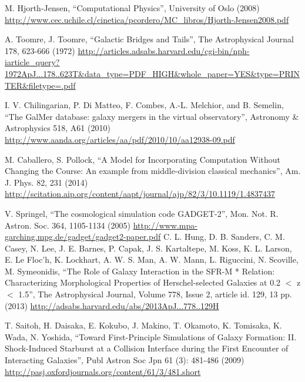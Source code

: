 \documentclass[11pt]{article}
\begin{document}
\begin{thebibliography}{99}

 M. Hjorth-Jensen, ``Computational Physics'', University of Oslo (2008) \url{http://www.cec.uchile.cl/cinetica/pcordero/MC_libros/Hjorth-Jensen2008.pdf}

 A. Toomre, J. Toomre, ``Galactic Bridges and Tails'', The Astrophysical Journal 178, 623-666 (1972) \url{http://articles.adsabs.harvard.edu/cgi-bin/nph-iarticle_query?1972ApJ...178..623T&data_type=PDF_HIGH&whole_paper=YES&type=PRINTER&filetype=.pdf}

I. V. Chilingarian, P. Di Matteo, F. Combes, A.-L. Melchior, and B. Semelin, ``The GalMer database: galaxy mergers in the virtual observatory'', Astronomy \& Astrophysics 518, A61 (2010) \url{http://www.aanda.org/articles/aa/pdf/2010/10/aa12938-09.pdf}

 M. Caballero, S. Pollock, ``A Model for Incorporating Computation Without Changing the Course: An example from middle-division classical mechanics'', Am. J. Phys. 82, 231 (2014) \url{http://scitation.aip.org/content/aapt/journal/ajp/82/3/10.1119/1.4837437}

 V. Springel, ``The cosmological simulation code GADGET-2'', Mon. Not. R. Astron. Soc. 364, 1105-1134 (2005) \url{http://www.mpa-garching.mpg.de/gadget/gadget2-paper.pdf}	 
 C. L. Hung, D. B. Sanders, C. M. Casey, N. Lee, J. E. Barnes, P. Capak, J. S. Kartaltepe, M. Koss, K. L. Larson, E. Le Floc'h, K. Lockhart, A. W. S. Man, A. W. Mann, L. Riguccini, N. Scoville, M. Symeonidis, ``The Role of Galaxy Interaction in the SFR-M * Relation: Characterizing Morphological Properties of Herschel-selected Galaxies at 0.2 $<$ z $<$ 1.5'', The Astrophysical Journal, Volume 778, Issue 2, article id. 129, 13 pp. (2013) \url{http://adsabs.harvard.edu/abs/2013ApJ...778..129H}

 T. Saitoh, H. Daisaka, E. Kokubo, J. Makino, T. Okamoto, K. Tomisaka, K. Wada, N. Yoshida, ``Toward First-Principle Simulations of Galaxy Formation: II. Shock-Induced Starburst at a Collision Interface during the First Encounter of Interacting Galaxies'', Publ Astron Soc Jpn 61 (3): 481-486 (2009) \url{http://pasj.oxfordjournals.org/content/61/3/481.short}


\end{thebibliography}
\end{document}
